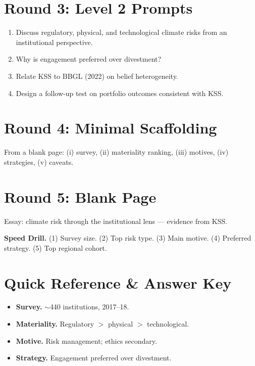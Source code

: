 \documentclass[11pt]{article}
\begin{document}
\section*{Round 3: Level 2 Prompts}
\begin{enumerate}
\item Discuss regulatory, physical, and technological climate risks from an institutional perspective.
\item Why is engagement preferred over divestment?
\item Relate KSS to BBGL (2022) on belief heterogeneity.
\item Design a follow-up test on portfolio outcomes consistent with KSS.
\end{enumerate}

\section*{Round 4: Minimal Scaffolding}
From a blank page: (i) survey, (ii) materiality ranking, (iii) motives, (iv) strategies, (v) caveats.

\section*{Round 5: Blank Page}
Essay: climate risk through the institutional lens --- evidence from KSS.

\vspace{6pt}
\begin{drillbox}
\textbf{Speed Drill.} (1) Survey size. (2) Top risk type. (3) Main motive. (4) Preferred strategy. (5) Top regional cohort.
\end{drillbox}

\section*{Quick Reference \& Answer Key}
\begin{answerbox}
\begin{itemize}
\item \textbf{Survey.} $\sim$440 institutions, 2017--18.
\item \textbf{Materiality.} Regulatory $>$ physical $>$ technological.
\item \textbf{Motive.} Risk management; ethics secondary.
\item \textbf{Strategy.} Engagement preferred over divestment.
\end{itemize}
\end{answerbox}
\end{document}
